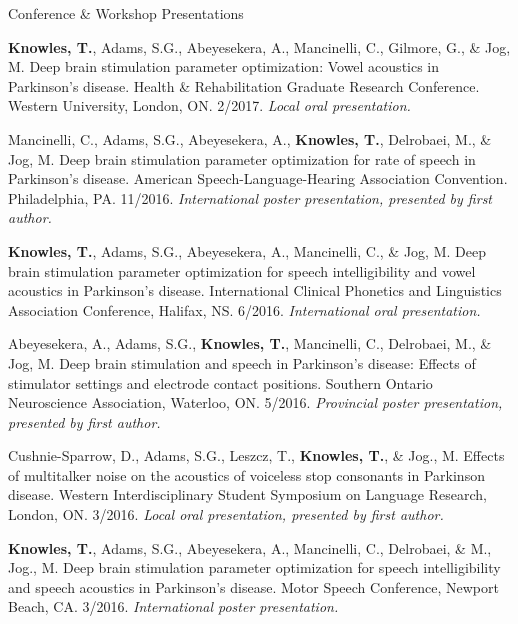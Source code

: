 \documentclass{resume} %
\begin{document}
\begin{rSection}{Conference \& Workshop Presentations}
	
	{\bf Knowles, T.}, Adams, S.G., Abeyesekera, A., Mancinelli, C., Gilmore, G., \& Jog, M. Deep brain stimulation parameter optimization: Vowel acoustics in Parkinson's disease. Health \& Rehabilitation Graduate Research Conference. Western University, London, ON. 2/2017. \emph{Local oral presentation.}
	
	Mancinelli, C., Adams, S.G., Abeyesekera, A., {\bf Knowles, T.}, Delrobaei, M., \& Jog, M. Deep brain stimulation parameter optimization for rate of speech in Parkinson's disease. American Speech-Language-Hearing Association Convention. Philadelphia, PA. 11/2016. \emph{International poster presentation, presented by first author.}
	
	{\bf Knowles, T.}, Adams, S.G., Abeyesekera, A., Mancinelli, C., \& Jog, M. Deep brain stimulation parameter optimization for speech intelligibility and vowel acoustics in Parkinson's disease. International Clinical Phonetics and Linguistics Association Conference, Halifax, NS. 6/2016. \emph{International oral presentation.}
	
	
	Abeyesekera, A., Adams, S.G., {\bf Knowles, T.}, Mancinelli, C., Delrobaei, M., \& Jog, M. Deep brain stimulation and speech in Parkinson's disease: Effects of stimulator settings and electrode contact positions. Southern Ontario Neuroscience Association, Waterloo, ON. 5/2016. \emph{Provincial poster presentation, presented by first author.}
	
	Cushnie-Sparrow, D., Adams, S.G., Leszcz, T., {\bf Knowles, T.},  \& Jog., M. Effects of multitalker noise on the acoustics of voiceless stop consonants in Parkinson disease. Western Interdisciplinary Student Symposium on Language Research, London, ON. 3/2016. \emph{Local oral presentation, presented by first author.}
	
	
	{\bf Knowles, T.}, Adams, S.G., Abeyesekera, A., Mancinelli, C., Delrobaei, \& M., Jog., M. Deep brain stimulation parameter optimization for speech intelligibility and speech acoustics in Parkinson's disease. Motor Speech Conference, Newport Beach, CA. 3/2016. \emph{International poster presentation.}
	

\end{rSection}
\end{document}
